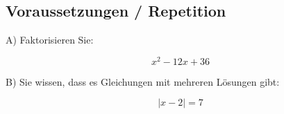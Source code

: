 

\subsection{Voraussetzungen / Repetition}

A) Faktorisieren Sie:

$$x^2-12x+36$$



B) Sie wissen, dass es Gleichungen mit mehreren Lösungen gibt:

$$|x-2| = 7$$



\newpage
